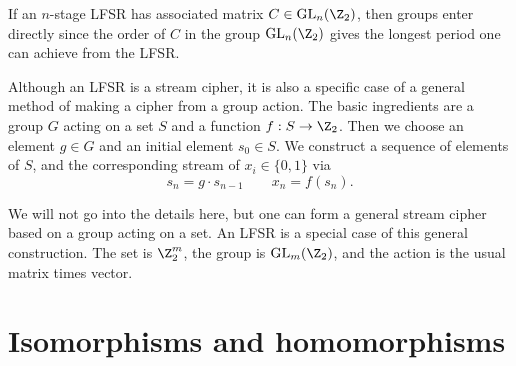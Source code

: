 \documentclass[12pt]{amsart}
\DeclareMathOperator{\GL}{GL}
\theoremstyle{plain}
\theoremstyle{definition}
\theoremstyle{remark}
\begin{document}
If an $n$-stage LFSR has associated matrix $C\in\GL_n(\Z_2)$, then
groups enter directly since the order of $C$ in the group
$\GL_n(\Z_2)$ gives the longest period one can achieve from the LFSR.

Although an LFSR is a stream cipher, it is also a specific case of a
general method of making a cipher from a group action.  The basic
ingredients are a group $G$ acting on a set $S$ and a function
$f:S\to\Z_2$.  Then we choose an element $g\in G$ and an initial
element $s_0\in S$.  We construct a sequence of elements of $S$, and
the corresponding stream of $x_i \in \{0,1\}$ via
\[ s_n = g\cdot s_{n-1} \qquad x_n = f(s_n).\]



We will not go into the details here, but one can form a general
stream cipher based on a group acting on a set.  An LFSR is a special
case of this general construction.  The set is $\Z_2^m$, the group
is $\GL_m(\Z_2)$, and the action is the usual matrix times vector.



\section{Isomorphisms and homomorphisms}
\end{document}
